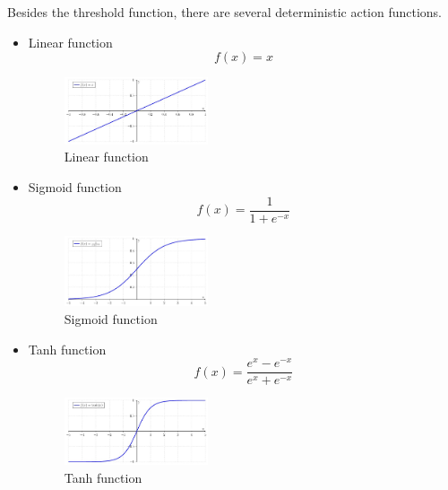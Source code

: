 Besides the threshold function, there are several deterministic action functions.
\begin{itemize}
  \item Linear function 
\begin{equation}\label{eq:LinearFunc}
f(x) = x
\end{equation}

\graphicspath{ {./Figures/} }
\begin{figure}[!htb]
\centering
\includegraphics[width=0.4\textwidth]{Linear_function.jpeg}
\caption{\label{fig:LinearFunc}Linear function}
\end{figure}
  
  \item Sigmoid function
\begin{equation}\label{eq:SigmoidFunc}
f(x) = \frac{1}{1+e^{-x}}
\end{equation}

\graphicspath{ {./Figures/} }
\begin{figure}[!htb]
\centering
\includegraphics[width=0.4\textwidth]{Logistic-curve.jpeg}
\caption{\label{fig:SigmoidFunc}Sigmoid function}
\end{figure}

  \item Tanh function
\begin{equation}\label{eq:TanhFunc}
f(x) = \frac{e^{x}-e^{-x}}{e^{x}+e^{-x}}
\end{equation}

\graphicspath{ {./Figures/} }
\begin{figure}[!htb]
\centering
\includegraphics[width=0.4\textwidth]{tanh.jpeg}
\caption{\label{fig:TanhFunc}Tanh function}
\end{figure}
\end{itemize}

